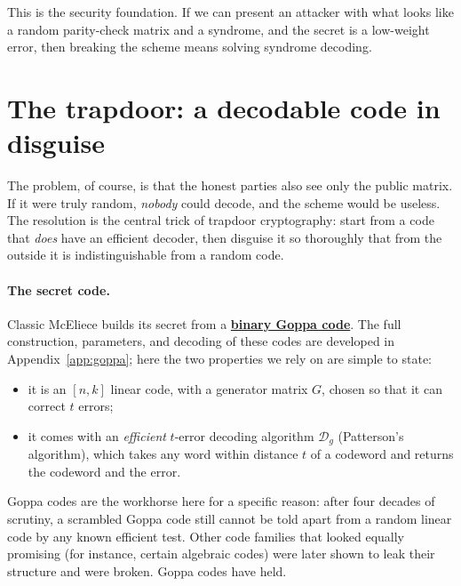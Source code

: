 This is the security foundation. If we can present an attacker with what looks like a random parity-check matrix and a syndrome, and the secret is a low-weight error, then breaking the scheme means solving syndrome decoding.

\section{The trapdoor: a decodable code in disguise}

The problem, of course, is that the honest parties also see only the public matrix. If it were truly random, \emph{nobody} could decode, and the scheme would be useless. The resolution is the central trick of trapdoor cryptography: start from a code that \emph{does} have an efficient decoder, then disguise it so thoroughly that from the outside it is indistinguishable from a random code.

\paragraph{The secret code.}
Classic McEliece builds its secret from a \hyperref[app:goppa]{\textbf{binary Goppa code}}. The full construction, parameters, and decoding of these codes are developed in Appendix~\ref{app:goppa}; here the two properties we rely on are simple to state:
\begin{itemize}
  \item it is an $[n,k]$ linear code, with a generator matrix $G$, chosen so that it can correct $t$ errors;
  \item it comes with an \emph{efficient} $t$-error decoding algorithm $\mathcal{D}_g$ (Patterson's algorithm), which takes any word within distance $t$ of a codeword and returns the codeword and the error.
\end{itemize}
Goppa codes are the workhorse here for a specific reason: after four decades of scrutiny, a scrambled Goppa code still cannot be told apart from a random linear code by any known efficient test. Other code families that looked equally promising (for instance, certain algebraic codes) were later shown to leak their structure and were broken. Goppa codes have held.

